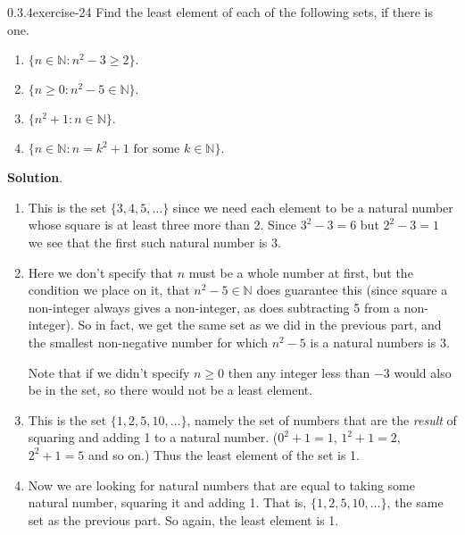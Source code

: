 \documentclass[twoside,11pt,]{book}
\numberwithin{equation}{chapter}
\newcommand{\N}{\mathbb N}
\newcommand{\st}{:}
\begin{document}
\begin{divisionsolution}{0.3.4}{}{exercise-24}%
\hypertarget{p-606}{}%
Find the least element of each of the following sets, if there is one.\leavevmode%
\begin{enumerate}[label=(\alph*)]
\item\hypertarget{li-600}{}\hypertarget{p-607}{}%
\(\{n \in \N \st n^2 - 3 \ge 2\}\text{.}\)%
\item\hypertarget{li-601}{}\hypertarget{p-609}{}%
\(\{n \ge 0 \st n^2 - 5 \in \N\}\text{.}\)%
\item\hypertarget{li-602}{}\hypertarget{p-611}{}%
\(\{n^2+1 \st n \in \N\}\text{.}\)%
\item\hypertarget{li-603}{}\hypertarget{p-613}{}%
\(\{n \in \N \st n = k^2 + 1 \text{ for some } k \in \N\}\text{.}\)%
\end{enumerate}
%
\par\smallskip%
\noindent\textbf{Solution}.\quad%
\hypertarget{p-615}{}%
\leavevmode%
\begin{enumerate}[label=(\alph*)]
\item\hypertarget{li-604}{}\hypertarget{p-616}{}%
This is the set \(\{3, 4, 5, \ldots \}\) since we need each element to be a natural number whose square is at least three more than 2. Since \(3^2 - 3 = 6\) but \(2^2 - 3 = 1\) we see that the first such natural number is 3.%
\item\hypertarget{li-605}{}\hypertarget{p-617}{}%
Here we don't specify that \(n\) must be a whole number at first, but the condition we place on it, that \(n^2 - 5 \in \N\) does guarantee this (since square a non-integer always gives a non-integer, as does subtracting 5 from a non-integer). So in fact, we get the same set as we did in the previous part, and the smallest non-negative number for which \(n^2 - 5\) is a natural numbers is 3.%
\par
\hypertarget{p-618}{}%
Note that if we didn't specify \(n \ge 0\) then any integer less than \(-3\) would also be in the set, so there would not be a least element.%
\item\hypertarget{li-606}{}\hypertarget{p-619}{}%
This is the set \(\{1, 2, 5, 10, \ldots\}\text{,}\) namely the set of numbers that are the \emph{result} of squaring and adding 1 to a natural number. (\(0^2 + 1 = 1\text{,}\) \(1^2 + 1 = 2\text{,}\) \(2^2 + 1 = 5\) and so on.) Thus the least element of the set is 1.%
\item\hypertarget{li-607}{}\hypertarget{p-620}{}%
Now we are looking for natural numbers that are equal to taking some natural number, squaring it and adding 1. That is, \(\{1, 2, 5, 10, \ldots\}\text{,}\) the same set as the previous part. So again, the least element is 1.%
\end{enumerate}
%
\end{divisionsolution}%
\end{document}
